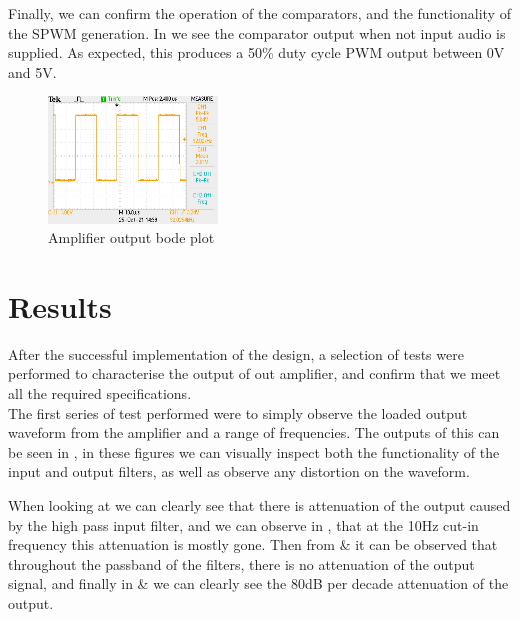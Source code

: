 \documentclass[a4paper,11pt]{article}
\begin{document}
\begin{figure}[h!]
\begin{subfigure}{0.49\textwidth}
        \label{F:envelope_implemented}
    \end{subfigure}
    \caption{}
\end{figure}

Finally, we can confirm the operation of the comparators, and the functionality of the SPWM generation. In  we see the comparator output when not input audio is supplied. As expected, this produces a 50\% duty cycle PWM output between 0V and 5V.

\begin{figure}[H]
    \centering
    \includegraphics[width=0.4\textwidth]{spwm/spwm_no_input.JPG}
    \caption{Amplifier output bode plot}
    \vspace{-20pt}
    \label{F:SPWM_implemented}
\end{figure}


\section{Results}

After the successful implementation of the design, a selection of tests were performed to characterise the output of out amplifier, and confirm that we meet all the required specifications.\\

The first series of test performed were to simply observe the loaded output waveform from the amplifier and a range of frequencies. The outputs of this can be seen in , in these figures we can visually inspect both the functionality of the input and output filters, as well as observe any distortion on the waveform. 

When looking at  we can clearly see that there is attenuation of the output caused by the high pass input filter, and we can observe in , that at the 10Hz cut-in frequency this attenuation is mostly gone. Then from  \&  it can be observed that throughout the passband of the filters, there is no attenuation of the output signal, and finally in  \&  we can clearly see the 80dB per decade attenuation of the output.\\
\end{document}
